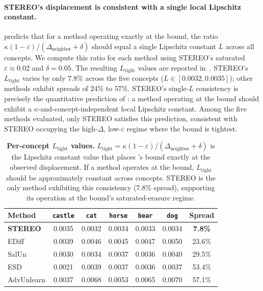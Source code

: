 \paragraph{STEREO's displacement is consistent with a single local Lipschitz constant.}
 predicts that for a method operating exactly at the bound, the ratio $\kappa(1-\varepsilon)/(\Delta_{\text{neighbor}} + \delta)$ should equal a single Lipschitz constant $L$ across all concepts. We compute this ratio for each method using STEREO's saturated $\varepsilon \approx 0.02$ and $\delta = 0.05$. The resulting $L_{\text{tight}}$ values are reported in~. STEREO's $L_{\text{tight}}$ varies by only $7.8\%$ across the five concepts ($L \in [0.0032, 0.0035]$); other methods exhibit spreads of $24\%$ to $57\%$. STEREO's single-$L$ consistency is precisely the quantitative prediction of : a method operating at the bound should exhibit a $\kappa$-and-concept-independent local Lipschitz constant. Among the five methods evaluated, only STEREO satisfies this prediction, consistent with STEREO occupying the high-$\Delta$, low-$\varepsilon$ regime where the bound is tightest.

\begin{table}[h]
\centering
\small
\setlength{\tabcolsep}{6pt}
\begin{tabular}{lcccccc}
\toprule
\textbf{Method} & \texttt{castle} & \texttt{cat} & \texttt{horse} & \texttt{bear} & \texttt{dog} & Spread \\
\midrule
\textbf{STEREO} & 0.0035 & 0.0032 & 0.0034 & 0.0033 & 0.0034 & \textbf{7.8\%} \\
EDiff           & 0.0039 & 0.0046 & 0.0045 & 0.0047 & 0.0050 & 23.6\% \\
SalUn           & 0.0030 & 0.0034 & 0.0037 & 0.0036 & 0.0040 & 29.5\% \\
ESD             & 0.0021 & 0.0039 & 0.0037 & 0.0036 & 0.0037 & 53.4\% \\
AdvUnlearn      & 0.0037 & 0.0068 & 0.0053 & 0.0065 & 0.0070 & 57.1\% \\
\bottomrule
\end{tabular}
\caption{\textbf{Per-concept $L_{\text{tight}}$ values.} $L_{\text{tight}} = \kappa(1-\varepsilon)/(\Delta_{\text{neighbor}} + \delta)$ is the Lipschitz constant value that places 's bound exactly at the observed displacement. If a method operates at the bound, $L_{\text{tight}}$ should be approximately constant across concepts. STEREO is the only method exhibiting this consistency ($7.8\%$ spread), supporting its operation at the bound's saturated-erasure regime.}
\label{tab:l_tight}
\end{table}

